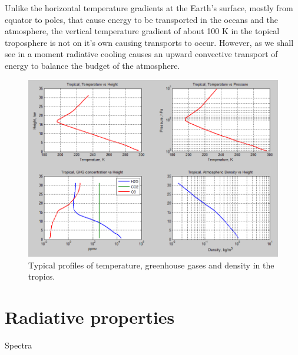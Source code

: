 \documentclass[12pt]{book}
\begin{document}
Unlike the horizontal temperature gradients at the Earth's surface, mostly from equator to poles, that cause energy to be transported in the oceans and the atmosphere, the vertical temperature gradient of about 100 K in the topical troposphere is not on it's own causing transports to occur. However, as we shall see in a moment radiative cooling causes an upward convective  transport of energy to balance the budget of the atmosphere.

\begin{figure}
\begin{center}
\includegraphics[width=17 cm]{../external_figures/atmospheric-radiation-13a-tropical-profile-temperature-gases-density}
\end{center}
\caption{ Typical profiles of temperature, greenhouse gases and density in the tropics.  } 
\label{fig:tropical_profiles}
\end{figure}

\section{Radiative properties}




Spectra
\end{document}
